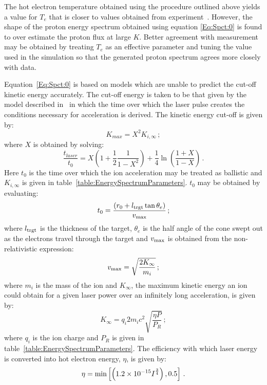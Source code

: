 The hot electron temperature obtained using the procedure outlined
above yields a value for $T_e$ that is closer to values obtained from
experiment~\cite{DOVER2020100847}.
However, the shape of the proton energy spectrum obtained using
equation \ref{Eq:Spct:0} is found to over estimate the proton flux at
large $K$.
Better agreement with measurement may be obtained by treating $T_e$ as
an effective parameter and tuning the value used in the simulation so
that the generated proton spectrum agrees more closely with data.

Equation~\ref{Eq:Spct:0} is based on models which are unable to
predict the cut-off kinetic energy accurately. 
The cut-off energy is taken to be that given by the model described
in~\cite{10.1103/PhysRevLett.97.045005} in which the time over which
the laser pulse creates the conditions necessary for acceleration is
derived.
The kinetic energy cut-off is given by:
\begin{equation}
  K_{max} = X^{2} K_{i,\infty} \, ;
  \label{eq:Eq:Spct:2}
\end{equation}
where $X$ is obtained by solving:
\begin{equation}
  \frac{t_{laser}}{t_{0}} = X \left( 1 + \frac{1}{2}
                           \frac{1}{1 - X^{2}} \right) +
                           \frac{1}{4} \ln \left( \frac{1+X}{1-X} \right) \, .
  \label{eq:Eq:Spct:1}
\end{equation}
Here $t_0$ is the time over which the ion acceleration may be treated
as ballistic and $K_{i,\infty}$ is given in
table~\ref{table:EnergySpectrumParameters}.
$t_0$ may be obtained by evaluating:
\begin{equation}
  t_0 = \frac{\left( r_0 + l_{\rm trgt} \tan\theta_e \right)}
             {v_{\rm max}} \, ;
\end{equation}
where $l_{\rm trgt}$ is the thickness of the target, $\theta_e$ is the
half angle of the cone swept out as the electrons travel through the
target and $v_{\rm max}$ is obtained from the non-relativistic
expression:
\begin{equation}
  v_{\rm max} = \sqrt{ \frac{2 K_\infty}{m_i} } \, ;
\end{equation}
where $m_i$ is the mass of the ion and $K_\infty$, the maximum kinetic
energy an ion could obtain for a given laser power over an infinitely
long acceleration, is given by:
\begin{equation}
  K_\infty = q_i 2m_i c^2 \sqrt{\frac{\eta P}{P_R}} \, ;
\end{equation}
where $q_i$ is the ion charge and $P_R$ is given in
table~\ref{table:EnergySpectrumParameters}.
The efficiency with which laser energy is converted into hot electron
energy, $\eta$, is given by:
\begin{equation}
  \eta = {\rm min} \left[
                         \left( 1.2 \times 10^{-15} I^{\frac{3}{4}} \right) ,
                         0.5
                   \right] \, .
\end{equation}

